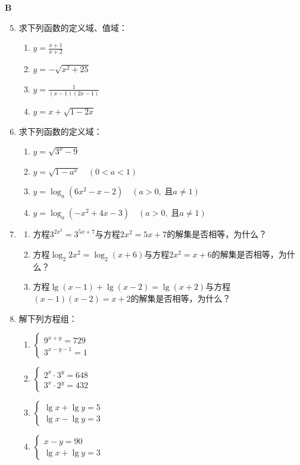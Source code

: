 \begin{center}
    \bfseries B
\end{center}

\begin{enumerate}\setcounter{enumi}{4}
    \item 求下列函数的定义域、值域：
\begin{multicols}{2}
\begin{enumerate}[(1)]
    \item $y=\frac{x+1}{x+2}$
    \item $y=-\sqrt{x^2+25}$
    \item $y=\frac{1}{(x-1)(2x-1)}$
    \item $y=x+\sqrt{1-2x}$
\end{enumerate}
\end{multicols}

\item 求下列函数的定义域：
\begin{enumerate}[(1)]
    \item $y=\sqrt{3^x-9}$
    \item $y=\sqrt{1-a^x}\quad (0<a<1)$
    \item $y=\log_a(6x^2-x-2)\quad (a>0,\;\text{且}a\ne 1)$
    \item $y=\log_a(-x^2+4x-3)\quad (a>0,\;\text{且}a\ne 1)$
\end{enumerate}

\item \begin{enumerate}[(1)]
    \item 方程$3^{2x^2}=3^{5x+7}$与方程$2x^2=5x+7$的解集是否相等，为什么？
    \item 方程$\log_2 2x^2=\log_2 (x+6)$与方程$2x^2=x+6$的解集是否相等，为什么？
    \item 方程$\lg(x-1)+\lg(x-2)=\lg(x+2)$与方程$(x-1)(x-2)=x+2$的解集是否相等，为什么？
\end{enumerate}

\item 解下列方程组：
\begin{multicols}{2}
\begin{enumerate}[(1)]
    \item $\begin{cases}
        9^{x+y}=729\\ 3^{x-y-1}=1
    \end{cases}$
\item $\begin{cases}
    2^x\cdot 3^y=648\\
    3^x\cdot 2^y=432
\end{cases}$
\item $\begin{cases}
    \lg x+\lg y=5\\ \lg x-\lg y=3
\end{cases}$
\item $\begin{cases}
    x-y=90\\ \lg x+\lg y=3
\end{cases}$
  \end{enumerate}  
\end{multicols}

\end{enumerate}
